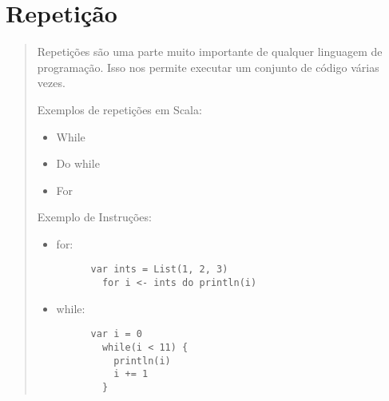 \section{Repeti\c{c}\~{a}o}
\begin{quote}
  Repetições são uma parte muito importante de qualquer linguagem de programação. Isso nos permite executar um conjunto de código várias vezes.
  \cite{Wampler2021}

  \hspace{2.5mm}Exemplos de repetições em Scala:

  \begin{itemize}

    \item While
    \item Do while
    \item For

  \end{itemize}

  \hspace{2.5mm}Exemplo de Instruções:

  \begin{itemize}
    \item for:


          \begin{lstlisting}
      var ints = List(1, 2, 3)
        for i <- ints do println(i)
      \end{lstlisting}

    \item while:

          \begin{lstlisting}
      var i = 0
        while(i < 11) {
          println(i)
          i += 1
        }
      \end{lstlisting}
  \end{itemize}
\end{quote}
